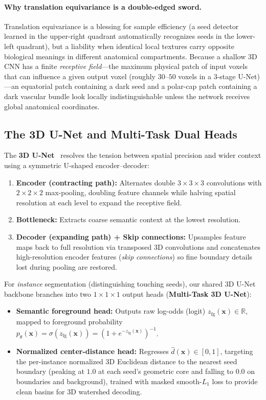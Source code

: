 \documentclass[10pt,a4paper]{article}
\renewcommand{\_}{\origunderscore\allowbreak}
\begin{document}
\paragraph{Why translation equivariance is a double-edged sword.} Translation equivariance is a blessing for sample efficiency (a seed detector learned in the upper-right quadrant automatically recognizes seeds in the lower-left quadrant), but a liability when identical local textures carry opposite biological meanings in different anatomical compartments. Because a shallow 3D CNN has a finite \emph{receptive field}---the maximum physical patch of input voxels that can influence a given output voxel (roughly $30\text{--}50$ voxels in a 3-stage U-Net)---an equatorial patch containing a dark seed and a polar-cap patch containing a dark vascular bundle look locally indistinguishable unless the network receives global anatomical coordinates.

\subsection{The 3D U-Net and Multi-Task Dual Heads}

The \textbf{3D U-Net}~\cite{ronneberger2015unet,cicek2016unet3d,isensee2021nnunet} resolves the tension between spatial precision and wider context using a symmetric U-shaped encoder--decoder:
\begin{enumerate}
    \item \textbf{Encoder (contracting path):} Alternates double $3 \times 3 \times 3$ convolutions with $2 \times 2 \times 2$ max-pooling, doubling feature channels while halving spatial resolution at each level to expand the receptive field.
    \item \textbf{Bottleneck:} Extracts coarse semantic context at the lowest resolution.
    \item \textbf{Decoder (expanding path) + Skip connections:} Upsamples feature maps back to full resolution via transposed 3D convolutions and concatenates high-resolution encoder features (\emph{skip connections}) so fine boundary details lost during pooling are restored.
\end{enumerate}
For \emph{instance} segmentation (distinguishing touching seeds), our shared 3D U-Net backbone branches into two $1 \times 1 \times 1$ output heads (\textbf{Multi-Task 3D U-Net}):
\begin{itemize}
    \item \textbf{Semantic foreground head:} Outputs raw log-odds (logit) $z_{\text{fg}}(\mathbf{x}) \in \mathbb{R}$, mapped to foreground probability $p_\theta(\mathbf{x}) = \sigma(z_{\text{fg}}(\mathbf{x})) = (1 + e^{-z_{\text{fg}}(\mathbf{x})})^{-1}$.
    \item \textbf{Normalized center-distance head:} Regresses $\hat{d}(\mathbf{x}) \in [0, 1]$, targeting the per-instance normalized 3D Euclidean distance to the nearest seed boundary (peaking at $1.0$ at each seed's geometric core and falling to $0.0$ on boundaries and background), trained with masked smooth-$L_1$ loss to provide clean basins for 3D watershed decoding.
\end{itemize}
\end{document}
